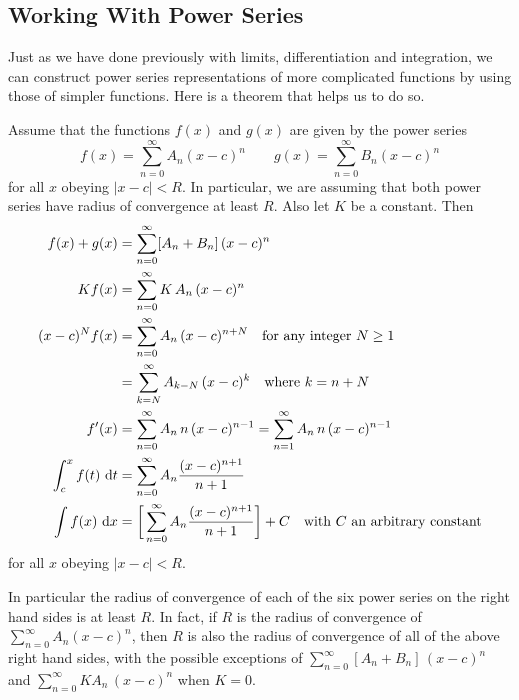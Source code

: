 \subsection{Working With Power Series}

Just as we have done previously with limits, differentiation
and integration, we can construct power series representations
of more complicated functions by using those of simpler functions.
Here is a theorem that helps us to do so.
\begin{theorem}\label{thm:SRpsops}
Assume that the functions $f(x)$ and $g(x)$ are given by the power series
\begin{equation*}
f(x) = \sum_{n=0}^\infty A_n (x-c)^n \qquad
g(x) = \sum_{n=0}^\infty B_n (x-c)^n
\end{equation*}
for all $x$ obeying $|x-c|<R$. In particular, we are assuming that both
power series have radius of convergence at least
$R$. Also let $K$ be a constant. Then
\begin{align*}
f(x)+g(x)   &= \sum_{n=0}^\infty [A_n+B_n]\, (x-c)^n \\
  Kf(x)     &= \sum_{n=0}^\infty K\, A_n\, (x-c)^n \\
(x-c)^Nf(x) &= \sum_{n=0}^\infty A_n\, (x-c)^{n+N}
                         \quad\text{for any integer $N\ge 1$}\\
           &= \sum_{k=N}^\infty A_{k-N}\, (x-c)^k
                         \quad\text{where $k=n+N$}\\
f'(x)     &= \sum_{n=0}^\infty A_n\, n\,(x-c)^{n-1}
           = \sum_{n=1}^\infty A_n\, n\,(x-c)^{n-1} \\
\int_c^x f(t)\ \mathrm{d}t &= \sum_{n=0}^\infty A_n \frac{(x-c)^{n+1}}{n+1} \\
\int  f(x)\ \mathrm{d}x &= \bigg[\sum_{n=0}^\infty A_n \frac{(x-c)^{n+1}}{n+1}\bigg]+C
\quad\text{with $C$ an arbitrary constant}
\end{align*}
for all $x$ obeying $|x-c|<R$.

In particular the radius of convergence of each of the six power
series on the right hand sides is at least $R$. In fact, if $R$
is the radius of convergence of $\sum\limits_{n=0}^\infty A_n (x-c)^n$,
then $R$ is also the radius of convergence of all of the above
right hand sides, with the possible exceptions of
$\sum\limits_{n=0}^\infty [A_n+B_n]\, (x-c)^n$ and
$\sum\limits_{n=0}^\infty KA_n\, (x-c)^n$ when $K=0$.
\end{theorem}


